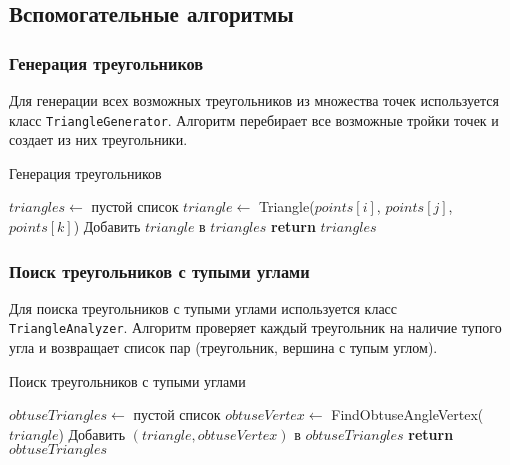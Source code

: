 \documentclass[a4paper,12pt]{article}
\begin{document}
\subsection{Вспомогательные алгоритмы}

\subsubsection{Генерация треугольников}

Для генерации всех возможных треугольников из множества точек используется класс \texttt{TriangleGenerator}. Алгоритм перебирает все возможные тройки точек и создает из них треугольники.

\begin{algorithm}
\caption{Генерация треугольников}
\begin{algorithmic}[1]
    \State $triangles \gets$ пустой список
                \State $triangle \gets$ Triangle($points[i]$, $points[j]$, $points[k]$)
                \State Добавить $triangle$ в $triangles$
            \EndFor
        \EndFor
    \EndFor
    \State \textbf{return} $triangles$
\EndProcedure
\end{algorithmic}
\end{algorithm}

\subsubsection{Поиск треугольников с тупыми углами}

Для поиска треугольников с тупыми углами используется класс \texttt{TriangleAnalyzer}. Алгоритм проверяет каждый треугольник на наличие тупого угла и возвращает список пар (треугольник, вершина с тупым углом).

\begin{algorithm}
\caption{Поиск треугольников с тупыми углами}
\begin{algorithmic}[1]
    \State $obtuseTriangles \gets$ пустой список
        \State $obtuseVertex \gets$ FindObtuseAngleVertex($triangle$)
            \State Добавить $(triangle, obtuseVertex)$ в $obtuseTriangles$
        \EndIf
    \EndFor
    \State \textbf{return} $obtuseTriangles$
\EndProcedure
\end{algorithmic}
\end{algorithm}
\end{document}
